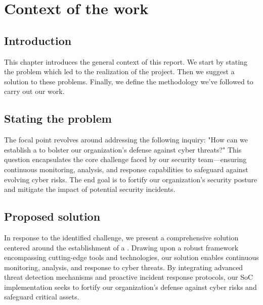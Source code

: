 \chapter{Context of the work}
\minitoc
\newpage

\setcounter{secnumdepth}{0} %
\section{Introduction}
This chapter introduces the general context of this report. We start by
stating the problem which led to the realization of the project. Then we suggest a solution to these problems. Finally, we define the methodology we've followed to carry out our work.

\setcounter{secnumdepth}{2} %
\section{Stating the problem}
The focal point revolves around addressing the following inquiry: "How can we establish a  to bolster our organization's defense against cyber threats?"
This question encapsulates the core challenge faced by our security team—ensuring continuous monitoring, analysis, and response capabilities to safeguard against evolving cyber risks.
The end goal is to fortify our organization's security posture and mitigate the impact of potential security incidents.

\section{Proposed solution}
In response to the identified challenge, we present a comprehensive solution centered around the establishment of a . Drawing upon a robust framework encompassing cutting-edge tools and technologies, our solution enables continuous monitoring, analysis, and response to cyber threats. By integrating advanced threat detection mechanisms and proactive incident response protocols, our SoC implementation seeks to fortify our organization's defense against cyber risks and safeguard critical assets.

